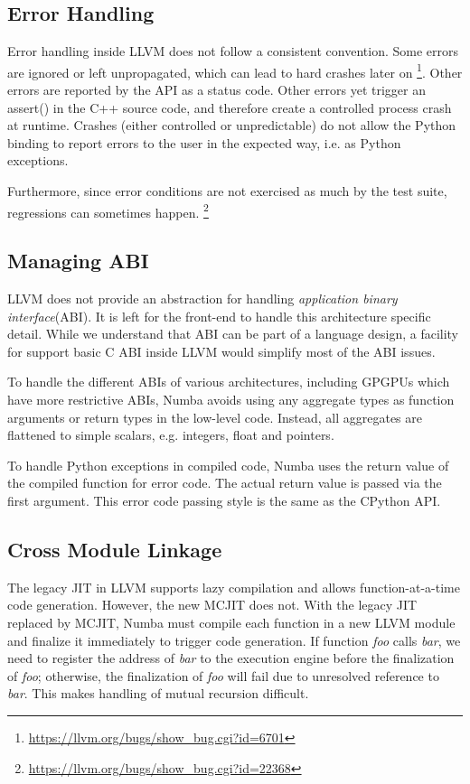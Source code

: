 \documentclass{acm_proc_article-sp}
\begin{document}
\subsection{Error Handling}

Error handling inside LLVM does not follow a consistent convention.
Some errors are ignored or left unpropagated, which can lead to hard crashes
later on \footnote{\url{https://llvm.org/bugs/show_bug.cgi?id=6701}}.  Other
errors are reported by the API as a status code.  Other errors yet
trigger an assert() in the C++ source code, and therefore create a
controlled process crash at runtime.  Crashes (either controlled or
unpredictable) do not allow the Python binding to report errors to the
user in the expected way, i.e. as Python exceptions.

Furthermore, since error conditions are not exercised as much by the test
suite, regressions can sometimes happen.
\footnote{\url{https://llvm.org/bugs/show_bug.cgi?id=22368}}

\subsection{Managing ABI}

LLVM does not provide an abstraction for handling \textit{application binary
interface}(ABI). It is left for the front-end to handle this architecture
specific detail.  While we understand that ABI can be part of a language
design, a facility for support basic C ABI inside LLVM would simplify most of the
ABI issues.

To handle the different ABIs of various architectures, including GPGPUs which
have more restrictive ABIs, Numba avoids using any aggregate types as function
arguments or return types in the low-level code.  Instead, all aggregates are
flattened to simple scalars, e.g. integers, float and pointers.

To handle Python exceptions in compiled code, Numba uses the return
value of the compiled function for error code. The actual return value
is passed via the first argument. This error code passing style is the
same as the CPython API.

\subsection{Cross Module Linkage}

The legacy JIT in LLVM supports lazy compilation and allows function-at-a-time
code generation.  However, the new MCJIT does not. With the legacy JIT replaced
by MCJIT, Numba must compile each function in a new LLVM module and finalize it
immediately to trigger code generation. If function \textit{foo} calls
\textit{bar}, we need to register the address of \textit{bar} to the execution
engine before the finalization of \textit{foo}; otherwise, the finalization of
\textit{foo} will fail due to unresolved reference to \textit{bar}.
This makes handling of mutual recursion difficult.
\end{document}
